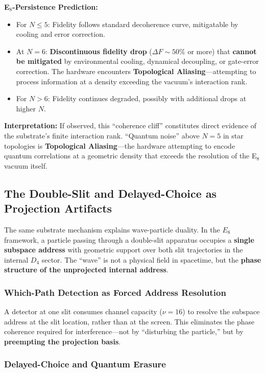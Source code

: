 \textbf{E$_8$-Persistence Prediction:} 
\begin{itemize}
    \item For $N \leq 5$: Fidelity follows standard decoherence curve, mitigatable by cooling and error correction.
    \item At $N = 6$: \textbf{Discontinuous fidelity drop} ($\Delta F \sim 50\%$ or more) that \textbf{cannot be mitigated} by environmental cooling, dynamical decoupling, or gate-error correction. The hardware encounters \textbf{Topological Aliasing}—attempting to process information at a density exceeding the vacuum's interaction rank.
    \item For $N > 6$: Fidelity continues degraded, possibly with additional drops at higher $N$.
\end{itemize}

\textbf{Interpretation:} If observed, this ``coherence cliff'' constitutes direct evidence of the substrate's finite interaction rank. ``Quantum noise'' above $N=5$ in star topologies is \textbf{Topological Aliasing}—the hardware attempting to encode quantum correlations at a geometric density that exceeds the resolution of the E$_8$ vacuum itself.

\subsection{The Double-Slit and Delayed-Choice as Projection Artifacts}

The same substrate mechanism explains wave-particle duality. In the $E_8$ framework, a particle passing through a double-slit apparatus occupies a \textbf{single subspace address} with geometric support over both slit trajectories in the internal $D_4$ sector. The ``wave'' is not a physical field in spacetime, but the \textbf{phase structure of the unprojected internal address}.

\subsubsection{Which-Path Detection as Forced Address Resolution}

A detector at one slit consumes channel capacity ($\nu = 16$) to resolve the subspace address at the slit location, rather than at the screen. This eliminates the phase coherence required for interference—not by ``disturbing the particle,'' but by \textbf{preempting the projection basis}.

\subsubsection{Delayed-Choice and Quantum Erasure}

